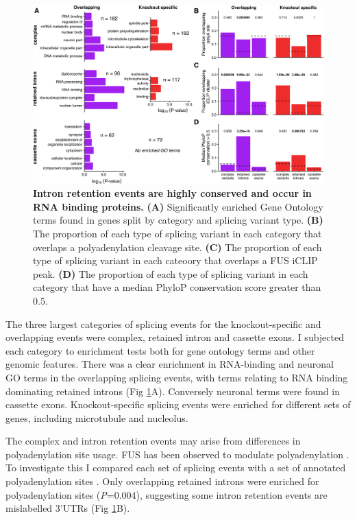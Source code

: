 \begin{figure}[t]
	\centering
	\includegraphics[width=\textwidth]{Figures/06_fus_meta/splicing_go_functions.png}
	\caption[Intron retention events are highly conserved and occur in RNA binding proteins]{
		\textbf{Intron retention events are highly conserved and occur in RNA binding proteins.} 
		\textbf{(A)} Significantly enriched Gene Ontology terms found in genes split by category and splicing variant type.
		\textbf{(B)} The proportion of each type of splicing variant in each category that overlaps a polyadenylation cleavage site.
		\textbf{(C)} The proportion of each type of splicing variant in each cateoory that overlaps a FUS iCLIP peak.
		\textbf{(D)} The proportion of each type of splicing variant in each category that have a median PhyloP conservation score greater than 0.5.
	}
	\label{fig:fus_splicing_functions}
\end{figure}

The three largest categories of splicing events for the knockout-specific and overlapping events were complex, retained intron and cassette exons. 
I subjected each category to enrichment tests both for gene ontology terms and other genomic features.
There was a clear enrichment in RNA-binding and neuronal GO terms in the overlapping splicing events, with terms relating to RNA binding dominating retained introns (Fig \ref{fig:fus_splicing_functions}A). 
Conversely neuronal terms were found in cassette exons. 
Knockout-specific splicing events were enriched for different sets of genes, including microtubule and nucleolus.

The complex and intron retention events may arise from differences in polyadenylation site usage.
FUS has been observed to modulate polyadenylation \citep{Masuda2015}.
To investigate this I compared each set of splicing events with a set of annotated polyadenylation sites \citep{Gruber2016}.
Only overlapping retained introns were enriched for polyadenylation sites (\textit{P}=0.004), suggesting some intron retention events are mislabelled 3'UTRs (Fig \ref{fig:fus_splicing_functions}B).

